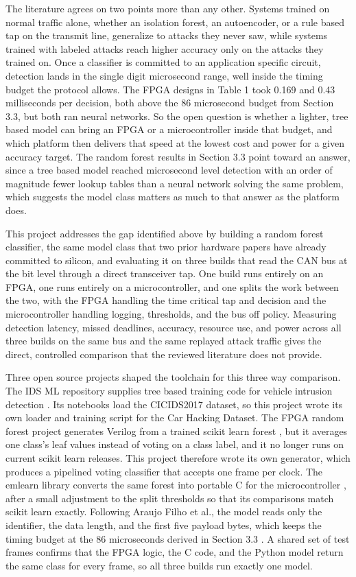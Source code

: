 \documentclass[11pt]{article}
\begin{document}
The literature agrees on two points more than any other. Systems trained on normal traffic alone, whether an isolation forest, an autoencoder, or a rule based tap on the transmit line, generalize to attacks they never saw, while systems trained with labeled attacks reach higher accuracy only on the attacks they trained on. Once a classifier is committed to an application specific circuit, detection lands in the single digit microsecond range, well inside the timing budget the protocol allows. The FPGA designs in Table 1 took 0.169 and 0.43 milliseconds per decision, both above the 86 microsecond budget from Section 3.3, but both ran neural networks. So the open question is whether a lighter, tree based model can bring an FPGA or a microcontroller inside that budget, and which platform then delivers that speed at the lowest cost and power for a given accuracy target. The random forest results in Section 3.3 point toward an answer, since a tree based model reached microsecond level detection with an order of magnitude fewer lookup tables than a neural network solving the same problem, which suggests the model class matters as much to that answer as the platform does.

This project addresses the gap identified above by building a random forest classifier, the same model class that two prior hardware papers have already committed to silicon, and evaluating it on three builds that read the CAN bus at the bit level through a direct transceiver tap. One build runs entirely on an FPGA, one runs entirely on a microcontroller, and one splits the work between the two, with the FPGA handling the time critical tap and decision and the microcontroller handling logging, thresholds, and the bus off policy. Measuring detection latency, missed deadlines, accuracy, resource use, and power across all three builds on the same bus and the same replayed attack traffic gives the direct, controlled comparison that the reviewed literature does not provide.

Three open source projects shaped the toolchain for this three way comparison. The IDS ML repository supplies tree based training code for vehicle intrusion detection \cite{idsml_github}. Its notebooks load the CICIDS2017 dataset, so this project wrote its own loader and training script for the Car Hacking Dataset. The FPGA random forest project generates Verilog from a trained scikit learn forest \cite{fpgarf_github}, but it averages one class's leaf values instead of voting on a class label, and it no longer runs on current scikit learn releases. This project therefore wrote its own generator, which produces a pipelined voting classifier that accepts one frame per clock. The emlearn library converts the same forest into portable C for the microcontroller \cite{emlearn_github}, after a small adjustment to the split thresholds so that its comparisons match scikit learn exactly. Following Araujo Filho et al., the model reads only the identifier, the data length, and the first five payload bytes, which keeps the timing budget at the 86 microseconds derived in Section 3.3 \cite{araujofilho2021}. A shared set of test frames confirms that the FPGA logic, the C code, and the Python model return the same class for every frame, so all three builds run exactly one model.
\end{document}
